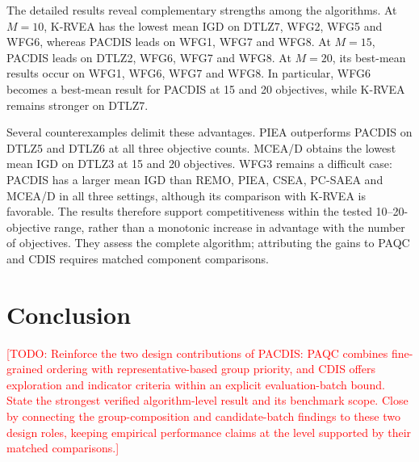 \documentclass[final,5p,times,twocolumn]{elsarticle}
\newcommand{\TODO}[1]{\textcolor{red}{[TODO: #1]}}
\begin{document}
The detailed results reveal complementary strengths among the algorithms.
At $M=10$, K-RVEA has the lowest mean IGD on DTLZ7, WFG2, WFG5 and WFG6,
whereas PACDIS leads on WFG1, WFG7 and WFG8. At $M=15$, PACDIS leads on
DTLZ2, WFG6, WFG7 and WFG8. At $M=20$, its best-mean results occur on
WFG1, WFG6, WFG7 and WFG8. In particular, WFG6 becomes a best-mean result
for PACDIS at 15 and 20 objectives, while K-RVEA remains stronger on DTLZ7.

Several counterexamples delimit these advantages. PIEA outperforms PACDIS
on DTLZ5 and DTLZ6 at all three objective counts. MCEA/D obtains the lowest
mean IGD on DTLZ3 at 15 and 20 objectives. WFG3 remains a difficult case:
PACDIS has a larger mean IGD than REMO, PIEA, CSEA, PC-SAEA and MCEA/D in
all three settings, although its comparison with K-RVEA is favorable.
The results therefore support competitiveness within the tested
10--20-objective range, rather than a monotonic increase in advantage with
the number of objectives. They assess the complete algorithm; attributing
the gains to PAQC and CDIS requires matched component comparisons.

\FloatBarrier
\section{Conclusion}
\label{sec:conclusion}
\TODO{Reinforce the two design contributions of PACDIS: PAQC combines
fine-grained ordering with representative-based group priority, and CDIS
offers exploration and indicator criteria within an
explicit evaluation-batch bound. State the strongest verified algorithm-level
result and its benchmark scope. Close by connecting the group-composition and
candidate-batch findings to these two design roles, keeping empirical performance
claims at the level supported by their matched comparisons.}
\end{document}
